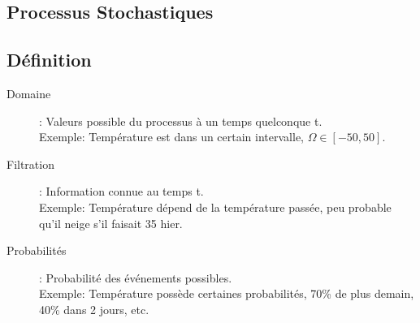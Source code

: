 \documentclass[10pt, french, landscape]{article}
\begin{document}
\begin{multicols*}{2}
%

\vfill\null

\section{Processus Stochastiques}

\subsection*{Définition}
\begin{description}
	\item[Domaine]: Valeurs possible du processus à un temps quelconque t. \\
	Exemple: Température est dans un certain intervalle, $\Omega \in [-50, 50]$.
	\item[Filtration]: Information connue au temps t.\\
	Exemple: Température dépend de la température passée, peu probable qu'il neige s'il faisait 35 hier.
	\item[Probabilités]: Probabilité des événements possibles.\\
	Exemple: Température possède certaines probabilités, 70\% de plus demain, 40\% dans 2 jours, etc.
\end{description}


\end{multicols*}
\end{document}
